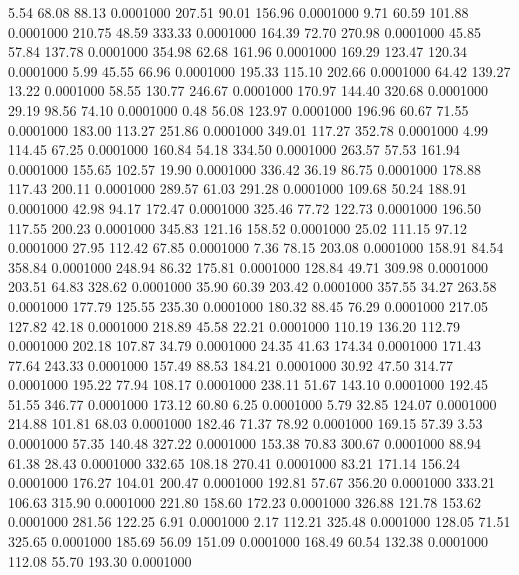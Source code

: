    5.54   68.08   88.13   0.0001000
 207.51   90.01  156.96   0.0001000
   9.71   60.59  101.88   0.0001000
 210.75   48.59  333.33   0.0001000
 164.39   72.70  270.98   0.0001000
  45.85   57.84  137.78   0.0001000
 354.98   62.68  161.96   0.0001000
 169.29  123.47  120.34   0.0001000
   5.99   45.55   66.96   0.0001000
 195.33  115.10  202.66   0.0001000
  64.42  139.27   13.22   0.0001000
  58.55  130.77  246.67   0.0001000
 170.97  144.40  320.68   0.0001000
  29.19   98.56   74.10   0.0001000
   0.48   56.08  123.97   0.0001000
 196.96   60.67   71.55   0.0001000
 183.00  113.27  251.86   0.0001000
 349.01  117.27  352.78   0.0001000
   4.99  114.45   67.25   0.0001000
 160.84   54.18  334.50   0.0001000
 263.57   57.53  161.94   0.0001000
 155.65  102.57   19.90   0.0001000
 336.42   36.19   86.75   0.0001000
 178.88  117.43  200.11   0.0001000
 289.57   61.03  291.28   0.0001000
 109.68   50.24  188.91   0.0001000
  42.98   94.17  172.47   0.0001000
 325.46   77.72  122.73   0.0001000
 196.50  117.55  200.23   0.0001000
 345.83  121.16  158.52   0.0001000
  25.02  111.15   97.12   0.0001000
  27.95  112.42   67.85   0.0001000
   7.36   78.15  203.08   0.0001000
 158.91   84.54  358.84   0.0001000
 248.94   86.32  175.81   0.0001000
 128.84   49.71  309.98   0.0001000
 203.51   64.83  328.62   0.0001000
  35.90   60.39  203.42   0.0001000
 357.55   34.27  263.58   0.0001000
 177.79  125.55  235.30   0.0001000
 180.32   88.45   76.29   0.0001000
 217.05  127.82   42.18   0.0001000
 218.89   45.58   22.21   0.0001000
 110.19  136.20  112.79   0.0001000
 202.18  107.87   34.79   0.0001000
  24.35   41.63  174.34   0.0001000
 171.43   77.64  243.33   0.0001000
 157.49   88.53  184.21   0.0001000
  30.92   47.50  314.77   0.0001000
 195.22   77.94  108.17   0.0001000
 238.11   51.67  143.10   0.0001000
 192.45   51.55  346.77   0.0001000
 173.12   60.80    6.25   0.0001000
   5.79   32.85  124.07   0.0001000
 214.88  101.81   68.03   0.0001000
 182.46   71.37   78.92   0.0001000
 169.15   57.39    3.53   0.0001000
  57.35  140.48  327.22   0.0001000
 153.38   70.83  300.67   0.0001000
  88.94   61.38   28.43   0.0001000
 332.65  108.18  270.41   0.0001000
  83.21  171.14  156.24   0.0001000
 176.27  104.01  200.47   0.0001000
 192.81   57.67  356.20   0.0001000
 333.21  106.63  315.90   0.0001000
 221.80  158.60  172.23   0.0001000
 326.88  121.78  153.62   0.0001000
 281.56  122.25    6.91   0.0001000
   2.17  112.21  325.48   0.0001000
 128.05   71.51  325.65   0.0001000
 185.69   56.09  151.09   0.0001000
 168.49   60.54  132.38   0.0001000
 112.08   55.70  193.30   0.0001000
